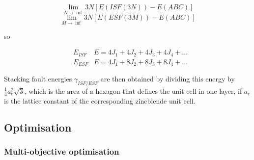 \documentclass[11pt]{article}
\begin{document}
\begin{enumerate}
\begin{enumerate}
\begin{enumerate}
$$ \lim_{N\rightarrow \inf} 3N[ E(ISF(3N)) - E(ABC) ] $$
$$ \lim_{M\rightarrow \inf} 3N[ E(ESF(3M)) - E(ABC) ] $$

so 
\begin{LaTeX}
\begin{align}
&E_{ISF}     &E = 4J_1 + 4J_2 + 4J_3 + 4J_4 + \ldots \\
&E_{ESF}     &E = 4J_1 + 8J_2 + 8J_3 + 8J_4 + \ldots 
\end{align}
\end{LaTeX}

Stacking fault energies \(\gamma_{ISF/ESF}\) are then obtained by dividing this
energy by \(\frac{1}{4} a_c^2 \sqrt{3}\), which is the area of a hexagon that
defines the unit cell in one layer, if \(a_c\) is the lattice constant of the
corresponding zincblende unit cell.
\end{enumerate}
\end{enumerate}
\end{enumerate}





\subsection{Optimisation}
\label{sec:org83734cb}
\subsubsection{Multi-objective optimisation}
\label{sec:org6c774f4}
\end{document}
